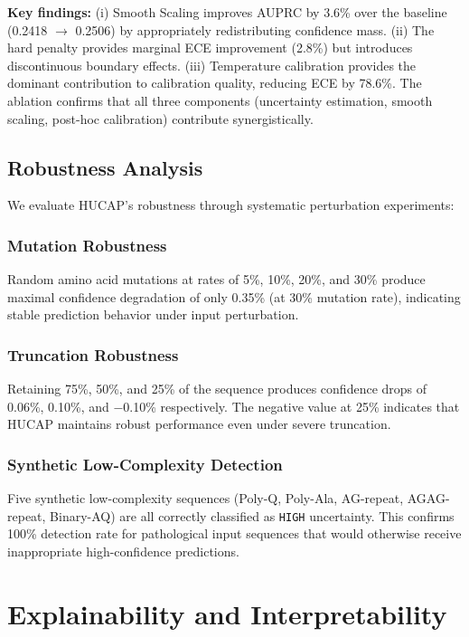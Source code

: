 \documentclass[conference]{IEEEtran}
\begin{document}
\textbf{Key findings:} (i) Smooth Scaling improves AUPRC by 3.6\% over the baseline (0.2418 $\to$ 0.2506) by appropriately redistributing confidence mass. (ii) The hard penalty provides marginal ECE improvement (2.8\%) but introduces discontinuous boundary effects. (iii) Temperature calibration provides the dominant contribution to calibration quality, reducing ECE by 78.6\%. The ablation confirms that all three components (uncertainty estimation, smooth scaling, post-hoc calibration) contribute synergistically.

\subsection{Robustness Analysis}

We evaluate HUCAP's robustness through systematic perturbation experiments:

\subsubsection{Mutation Robustness}
Random amino acid mutations at rates of 5\%, 10\%, 20\%, and 30\% produce maximal confidence degradation of only 0.35\% (at 30\% mutation rate), indicating stable prediction behavior under input perturbation.

\subsubsection{Truncation Robustness}
Retaining 75\%, 50\%, and 25\% of the sequence produces confidence drops of 0.06\%, 0.10\%, and $-$0.10\% respectively. The negative value at 25\% indicates that HUCAP maintains robust performance even under severe truncation.

\subsubsection{Synthetic Low-Complexity Detection}
Five synthetic low-complexity sequences (Poly-Q, Poly-Ala, AG-repeat, AGAG-repeat, Binary-AQ) are all correctly classified as \texttt{HIGH} uncertainty. This confirms 100\% detection rate for pathological input sequences that would otherwise receive inappropriate high-confidence predictions.

\section{Explainability and Interpretability}
\end{document}
